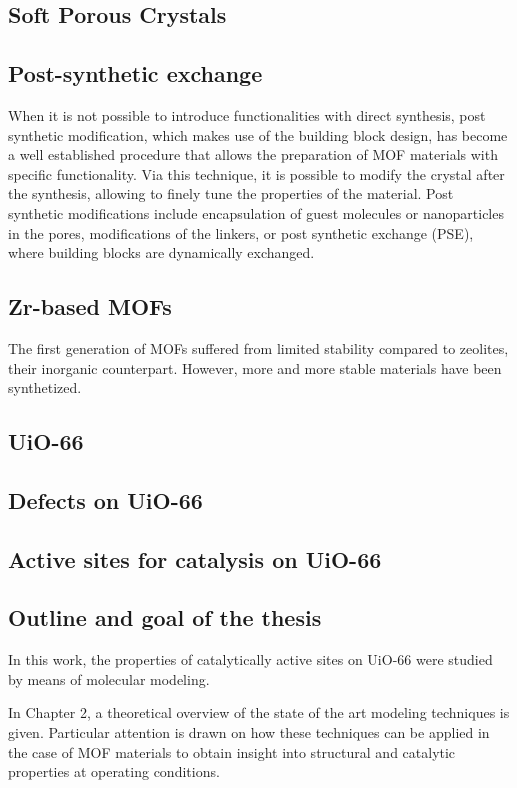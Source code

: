 \subsection*{Soft Porous Crystals}


\subsection*{Post-synthetic exchange}
When it is not possible to introduce functionalities with direct synthesis, post synthetic modification, which makes use of the building block design, has become a well established procedure that allows the preparation of MOF materials with specific functionality. Via this technique, it is possible to modify the crystal after the synthesis, allowing to finely tune the properties of the material. Post synthetic modifications include encapsulation of guest molecules or nanoparticles in the pores, modifications of the linkers, or post synthetic exchange (PSE), where building blocks are dynamically exchanged.

\subsection*{Zr-based MOFs}
The first generation of MOFs suffered from limited stability compared to zeolites, their inorganic counterpart. However, more and more stable materials have been synthetized. 

\subsection*{UiO-66}

\subsection*{Defects on UiO-66}

\subsection*{Active sites for catalysis on UiO-66}


\subsection*{Outline and goal of the thesis}
In this work, the properties of catalytically active sites on UiO-66 were studied by means of molecular modeling. 

In Chapter 2, a theoretical overview of the state of the art modeling techniques is given. Particular attention is drawn on how these techniques can be applied in the case of MOF materials to obtain insight into structural and catalytic properties at operating conditions.

